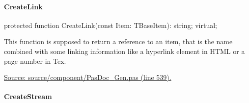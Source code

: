 \documentclass{report}
\newif\ifpdf
\begin{document}
\paragraph*{CreateLink}\hspace*{\fill}

\label{PasDoc_Gen.TDocGenerator-CreateLink}
\begin{list}{}{
\setlength{\itemindent}{0cm}
\setlength{\listparindent}{0cm}
\setlength{\leftmargin}{\evensidemargin}
\addtolength{\leftmargin}{\tmplength}
\settowidth{\labelsep}{X}
\addtolength{\leftmargin}{\labelsep}
\setlength{\labelwidth}{\tmplength}
}
\item[\textbf{Declaration}\hfill]
\ifpdf
\begin{flushleft}
\fi
\begin{ttfamily}
protected function CreateLink(const Item: TBaseItem): string; virtual;\end{ttfamily}

\ifpdf
\end{flushleft}
\fi

\par
\item[\textbf{Description}]
This function is supposed to return a reference to an item, that is the name combined with some linking information like a hyperlink element in HTML or a page number in Tex.\par
\href{https://github.com/pasdoc/pasdoc/blob/master/source/component/PasDoc_Gen.pas#L539}{Source: source/component/PasDoc{\_}Gen.pas (line 539).}

\end{list}
\paragraph*{CreateStream}\hspace*{\fill}
\end{document}
